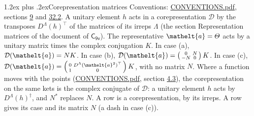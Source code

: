 \documentclass[10pt,a4paper]{article}
\makeatletter
\renewcommand\section{\@startsection{section}{1}{\z@}{-3ex plus -1ex minus -.2ex}%
  {1.2ex plus .2ex}{\normalfont\large\sffamily\bfseries\color{parttitle}}}
\numberwithin{equation}{section}
\newcommand{\eltfont}[1]{{\let\sigma\eltsigma\mathelt{#1}}}
\newcommand{\grp}[1]{\mathsf{#1}}
\newcommand{\elt}[1]{\eltfont{#1}}
\makeatother
\begin{document}
\section{Corepresentation matrices}\label{s:corep_matrices}
Conventions: \href{../../CONVENTIONS.pdf}{CONVENTIONS.pdf}, sections \href{../../../rotation/CONVENTIONS.pdf\#conv.9}{9} and \href{../../CONVENTIONS.pdf\#conv.32.2}{32.2}.
A unitary element $h$ acts in a corepresentation $\mathcal{D}$ by the transposes $D^{\Lambda}(h)^{\top}$ of the matrices of its irreps $\Lambda$ (the section Representation matrices of the document of \href{../../../rotation/data/pdf/C9v.pdf}{$\grp{C_{9v}}$}). The representative $\elt{a} = \varTheta$ acts by a unitary matrix times the complex conjugation $K$.
In case (a), $\mathcal{D}(\elt{a}) = NK$. In case (b), $\mathcal{D}(\elt{a}) = \left(\begin{smallmatrix} 0 & N \\ -N & 0 \end{smallmatrix}\right) K$. In case (c), $\mathcal{D}(\elt{a}) = \left(\begin{smallmatrix} 0 & D^{\Lambda}(\elt{a}^2)^{\top} \\ 1 & 0 \end{smallmatrix}\right) K$, with no matrix $N$.
Where a function moves with the points (\href{../../CONVENTIONS.pdf}{CONVENTIONS.pdf}, section \href{../../../rotation/CONVENTIONS.pdf\#conv.4.3}{4.3}), the corepresentation on the same kets is the complex conjugate of $\mathcal{D}$: a unitary element $h$ acts by $D^{\Lambda}(h)^{\dagger}$, and $N^{*}$ replaces $N$.
A row is a corepresentation, by its irreps. A row gives its case and its matrix $N$ (a dash in case (c)).
\end{document}
